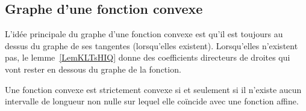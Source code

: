 \subsection{Graphe d'une fonction convexe}

L'idée principale du graphe d'une fonction convexe est qu'il est toujours au dessus du graphe de ses tangentes (lorsqu'elles existent). Lorsqu'elles n'existent pas, le lemme~\ref{LemKLTsHIQ} donne des coefficients directeurs de droites qui vont rester en dessous du graphe de la fonction.

\begin{proposition}      \label{PROPooOCOEooEGybmS}
	Une fonction convexe est strictement convexe si et seulement si il n'existe aucun intervalle de longueur non nulle sur lequel elle coïncide avec une fonction affine.
\end{proposition}

